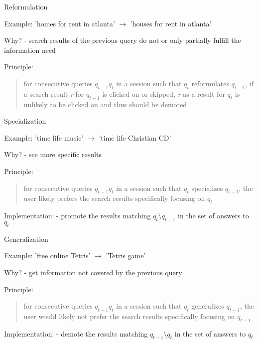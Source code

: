 \begin{frame}{Reformulation}

Example: \newline
'homes for rent in atlanta' $ \rightarrow $ 'houses for rent in atlanta' \newline

Why? \newline
- search results of the previous query do not or only partially fulfill the information need \newline

Principle:
\begin{quotation}
for consecutive queries $ q_{t-1}q_{t} $ in a session such that $ q_{t} $ reformulates $ q_{t-1} $, if a search result \emph{r} for $ q_{t-1} $ is clicked on or skipped, \emph{r} as a result for $ q_{t} $ is unlikely to be clicked on and thus should be demoted
\end{quotation}

\end{frame}


\begin{frame}{Specialization}

Example: \newline
'time life music' $ \rightarrow $ 'time life Christian CD' \newline

Why? \newline
- see more specific results \newline

Principle:
\begin{quotation}
for consecutive queries $ q_{t-1}q_{t} $ in a session such that $ q_{t} $ specializes $ q_{t-1} $, the user likely prefers the search results specifically focusing on $ q_{t} $
\end{quotation}

Implementation: \newline
- promote the results matching $ q_{t} \setminus q_{t-1} $ in the set of answers to $ q_{t} $

\end{frame}


\begin{frame}{Generalization}

Example: \newline
'free online Tetris' $ \rightarrow $ 'Tetris game' \newline

Why? \newline
- get information not covered by the previous query \newline

Principle:
\begin{quotation}
for consecutive queries $ q_{t-1}q_{t} $ in a session such that $ q_{t} $ generalizes $ q_{t-1} $, the user would likely not prefer the search results specifically focusing on $ q_{t-1} $
\end{quotation}

Implementation: \newline
- demote the results matching $ q_{t-1} \setminus q_{t} $ in the set of answers to $ q_{t} $

\end{frame}


